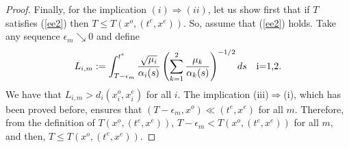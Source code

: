 \begin{proof}
Finally, for the implication $(i) \Rightarrow (ii)$, let us show first that if $T$
satisfies (\ref{ee2}) then $T\leq T(x^o,(t^e,x^e))$. So, assume that (\ref{ee2}) holds. %
Take any sequence $\epsilon_{m} \searrow 0$ and define
\[
L_{i,m}:=\int_{T-\epsilon_m}^{t^{e}} \frac{\sqrt{\mu_{i}}}{\alpha_{i}(s)}\left(\sum_{k=1}^{2} \frac{\mu_{k}}{\alpha_{k}(s)} \right)^{-1/2}ds\quad\hbox{i=1,2.}
\]
We have that $L_{i,m}>d_{i}(x_{i}^o,x_{i}^{e})$ for all $i$. The implication (iii)$\Rightarrow$(i), which has been proved before, ensures that
$(T-\epsilon_{m},x^o) \ll (t^e,x^e)$ for all $m$. Therefore, from the definition of $T(x^o,(t^e,x^e))$, $T-\epsilon_{m}<T(x^o,(t^e,x^e))$ for all $m$, and then, $T \leq T(x^o,(t^e,x^e))$.



\end{proof}
